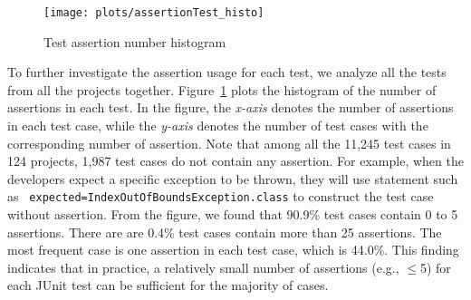 \begin{figure}[t]
\center
\texttt{[image: plots/assertionTest\_histo]}
\caption{\label{fig:assert_case_histo}Test assertion number histogram}
\end{figure}

\begin{comment}
\begin{figure}[t]
\center
\texttt{[image: plots/assertionSLOC\_histo]}
\caption{\label{fig:assert_sloc_histo}Assertion per SLOC Histogram}
\end{figure}
\end{comment}


To further investigate the assertion usage for each test, we analyze
all the tests from all the projects
together. Figure~\ref{fig:assert_case_histo} plots the histogram of
the number of assertions in each test. In the figure, the {\em x-axis}
denotes the number of assertions in each test case, while the {\em
y-axis} denotes the number of test cases with the corresponding number
of assertion. Note that among all the 11,245 test cases in 124
projects, 1,987 test cases do not contain any assertion. For example,
when the developers expect a specific exception to be thrown, they
will use statement such as {\tt
expected=IndexOutOfBoundsException.class} to construct the test case
without assertion. From the figure, we found that 90.9\% test cases
contain 0 to 5 assertions. There are are 0.4\% test cases contain more
than 25 assertions. The most
frequent case is one assertion in each test case, which is 44.0\%. 
This finding indicates that in practice, a relatively
small number of assertions (e.g., $\le$5) for each JUnit test can be
sufficient for the majority of cases.




\noindent
{}

